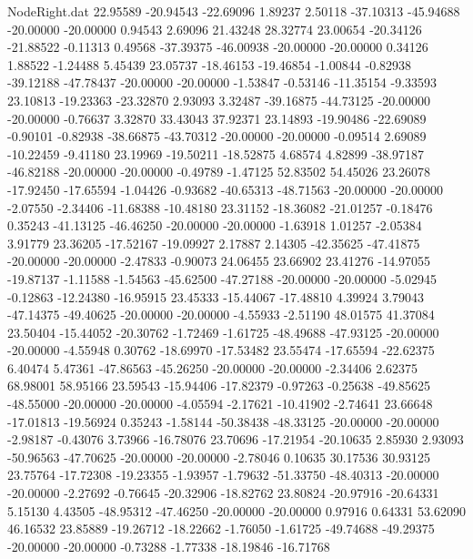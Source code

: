 \begin{filecontents}{NodeRight.dat}
  22.95589  -20.94543  -22.69096     1.89237    2.50118  -37.10313  -45.94688  -20.00000  -20.00000    0.94543    2.69096   21.43248   28.32774
  23.00654  -20.34126  -21.88522    -0.11313    0.49568  -37.39375  -46.00938  -20.00000  -20.00000    0.34126    1.88522   -1.24488    5.45439
  23.05737  -18.46153  -19.46854    -1.00844   -0.82938  -39.12188  -47.78437  -20.00000  -20.00000   -1.53847   -0.53146  -11.35154   -9.33593
  23.10813  -19.23363  -23.32870     2.93093    3.32487  -39.16875  -44.73125  -20.00000  -20.00000   -0.76637    3.32870   33.43043   37.92371
  23.14893  -19.90486  -22.69089    -0.90101   -0.82938  -38.66875  -43.70312  -20.00000  -20.00000   -0.09514    2.69089  -10.22459   -9.41180
  23.19969  -19.50211  -18.52875     4.68574    4.82899  -38.97187  -46.82188  -20.00000  -20.00000   -0.49789   -1.47125   52.83502   54.45026
  23.26078  -17.92450  -17.65594    -1.04426   -0.93682  -40.65313  -48.71563  -20.00000  -20.00000   -2.07550   -2.34406  -11.68388  -10.48180
  23.31152  -18.36082  -21.01257    -0.18476    0.35243  -41.13125  -46.46250  -20.00000  -20.00000   -1.63918    1.01257   -2.05384    3.91779
  23.36205  -17.52167  -19.09927     2.17887    2.14305  -42.35625  -47.41875  -20.00000  -20.00000   -2.47833   -0.90073   24.06455   23.66902
  23.41276  -14.97055  -19.87137    -1.11588   -1.54563  -45.62500  -47.27188  -20.00000  -20.00000   -5.02945   -0.12863  -12.24380  -16.95915
  23.45333  -15.44067  -17.48810     4.39924    3.79043  -47.14375  -49.40625  -20.00000  -20.00000   -4.55933   -2.51190   48.01575   41.37084
  23.50404  -15.44052  -20.30762    -1.72469   -1.61725  -48.49688  -47.93125  -20.00000  -20.00000   -4.55948    0.30762  -18.69970  -17.53482
  23.55474  -17.65594  -22.62375     6.40474    5.47361  -47.86563  -45.26250  -20.00000  -20.00000   -2.34406    2.62375   68.98001   58.95166
  23.59543  -15.94406  -17.82379    -0.97263   -0.25638  -49.85625  -48.55000  -20.00000  -20.00000   -4.05594   -2.17621  -10.41902   -2.74641
  23.66648  -17.01813  -19.56924     0.35243   -1.58144  -50.38438  -48.33125  -20.00000  -20.00000   -2.98187   -0.43076    3.73966  -16.78076
  23.70696  -17.21954  -20.10635     2.85930    2.93093  -50.96563  -47.70625  -20.00000  -20.00000   -2.78046    0.10635   30.17536   30.93125
  23.75764  -17.72308  -19.23355    -1.93957   -1.79632  -51.33750  -48.40313  -20.00000  -20.00000   -2.27692   -0.76645  -20.32906  -18.82762
  23.80824  -20.97916  -20.64331     5.15130    4.43505  -48.95312  -47.46250  -20.00000  -20.00000    0.97916    0.64331   53.62090   46.16532
  23.85889  -19.26712  -18.22662    -1.76050   -1.61725  -49.74688  -49.29375  -20.00000  -20.00000   -0.73288   -1.77338  -18.19846  -16.71768

\end{filecontents}
